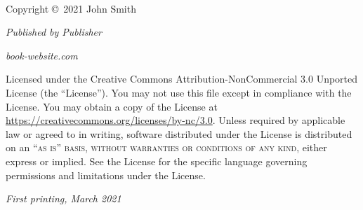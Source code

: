 \documentclass[a4paper,12pt]{book}
\begin{document}
    \newpage
    \thispagestyle{empty}
    ~\vfill

    \noindent Copyright \copyright\ 2021 John Smith %

    \noindent \textsl{Published by Publisher} %

    \noindent \textit{book-website.com} %

    \noindent Licensed under the Creative Commons Attribution-NonCommercial 3.0 Unported License
    (the ``License'').
    You may not use this file except in compliance with the License.
    You may obtain a copy of the License at \url{https://creativecommons.org/licenses/by-nc/3.0}.
    Unless required by applicable law or agreed to in writing, software distributed under the
    License is distributed on an \textsc{``as is'' basis, without warranties or conditions of any
    kind}, either express or implied.
    See the License for the specific language governing permissions and limitations under the
    License. %

    \noindent \textit{First printing, March 2021} %

    \pagestyle{empty} %

    \tableofcontents %

    \let\cleardoublepage\clearpage  %


    \pagestyle{fancy} %

    

    
\end{document}
